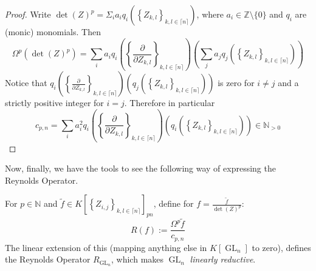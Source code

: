 \begin{proof}
  Write $ \operatorname{det} (Z)^p = \Sigma_i a_i q_i \left( \left\{ Z_{k,l} \right\}_{k,l \in \lceil n \rceil} \right) $, where $a_i \in \mathbb{Z} \setminus \{0\}$ and $q_i$ are (monic) monomials.
  Then
  \begin{equation}
    \Omega^p \left( \operatorname{det} (Z)^p \right)
    = \sum_i a_i q_i \left( \left\{ \frac{\partial}{\partial Z_{k,l}} \right\}_{k,l \in \lceil n \rceil} \right) \left( \sum_j a_j q_j \left( \left\{ Z_{k,l} \right\}_{k,l \in \lceil n \rceil} \right) \right)
  \end{equation}
  Notice that $ q_i \left( \left\{ \frac{\partial}{\partial Z_{k,l}} \right\}_{k,l \in \lceil n \rceil} \right) \left( q_j \left( \left\{ Z_{k,l} \right\}_{k,l \in \lceil n \rceil} \right) \right) $ is zero for $ i \neq j $ and a strictly positive integer for $ i = j $.
  Therefore in particular
  \begin{equation}
    c_{p,n}
    = \sum_i a_i^2 q_i \left( \left\{ \frac{\partial}{\partial Z_{k,l}} \right\}_{k,l \in \lceil n \rceil} \right) \left( q_i \left( \left\{ Z_{k,l} \right\}_{k,l \in \lceil n \rceil} \right) \right) \in \mathbb{N}_{>0}
  \end{equation}
\end{proof}
Now, finally, we have the tools to see the following way of expressing the Reynolds Operator.
\begin{theorem}
  For $ p \in \mathbb{N} $ and $ \tilde{f} \in K \left\lbrack \left\{ Z_{i,j} \right\}_{k,l \in \lceil n \rceil} \right\rbrack_{pn} $, define for $ f = \frac{\tilde{f}}{\operatorname{det}(Z)^p}$:
  \begin{equation}
    R \left( f \right) := \frac{\Omega^p \tilde{f}}{c_{p,n}}
  \end{equation}
  The linear extension of this (mapping anything else in $K \left\lbrack \operatorname{GL}_n \right\rbrack$ to zero), defines the Reynolds Operator $R_{\operatorname{GL}_n}$, which makes $\operatorname{GL}_n$ \textit{linearly reductive}.
\end{theorem}

